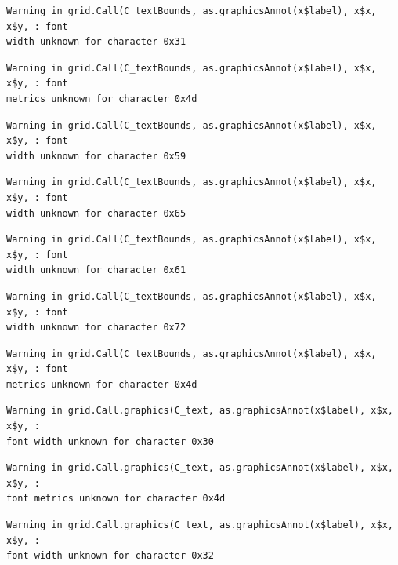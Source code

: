 \documentclass[
  letterpaper,
  DIV=11,
  numbers=noendperiod]{scrreprt}
\begin{document}
\begin{verbatim}
Warning in grid.Call(C_textBounds, as.graphicsAnnot(x$label), x$x, x$y, : font
width unknown for character 0x31
\end{verbatim}

\begin{verbatim}
Warning in grid.Call(C_textBounds, as.graphicsAnnot(x$label), x$x, x$y, : font
metrics unknown for character 0x4d
\end{verbatim}

\begin{verbatim}
Warning in grid.Call(C_textBounds, as.graphicsAnnot(x$label), x$x, x$y, : font
width unknown for character 0x59
\end{verbatim}

\begin{verbatim}
Warning in grid.Call(C_textBounds, as.graphicsAnnot(x$label), x$x, x$y, : font
width unknown for character 0x65
\end{verbatim}

\begin{verbatim}
Warning in grid.Call(C_textBounds, as.graphicsAnnot(x$label), x$x, x$y, : font
width unknown for character 0x61
\end{verbatim}

\begin{verbatim}
Warning in grid.Call(C_textBounds, as.graphicsAnnot(x$label), x$x, x$y, : font
width unknown for character 0x72
\end{verbatim}

\begin{verbatim}
Warning in grid.Call(C_textBounds, as.graphicsAnnot(x$label), x$x, x$y, : font
metrics unknown for character 0x4d
\end{verbatim}

\begin{verbatim}
Warning in grid.Call.graphics(C_text, as.graphicsAnnot(x$label), x$x, x$y, :
font width unknown for character 0x30
\end{verbatim}

\begin{verbatim}
Warning in grid.Call.graphics(C_text, as.graphicsAnnot(x$label), x$x, x$y, :
font metrics unknown for character 0x4d
\end{verbatim}

\begin{verbatim}
Warning in grid.Call.graphics(C_text, as.graphicsAnnot(x$label), x$x, x$y, :
font width unknown for character 0x32
\end{verbatim}
\end{document}
